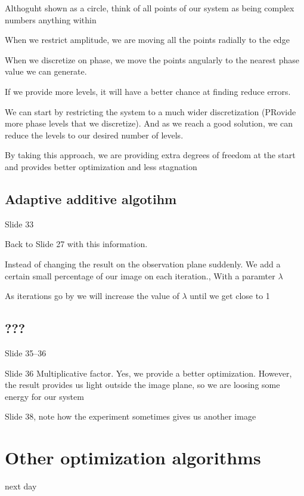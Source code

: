 \documentclass[../main/main.tex]{subfiles}
\begin{document}
Althoguht shown as a circle, think of all points of our system as being complex numbers anything within

When we restrict amplitude, we are moving all the points radially to the edge

When we discretize on phase, we move the points angularly to the nearest phase value we can generate.

If we provide more levels, it will have a better chance at finding reduce errors.

We can start by restricting the system to a much wider discretization (PRovide more phase levels that we discretize). And as we reach a good solution, we can reduce the levels to our desired number of levels.

By taking this approach, we are  providing extra degrees of freedom at the start and provides better optimization and less stagnation

\subsection{Adaptive additive algotihm}
Slide 33

Back to Slide 27 with this information.

Instead of changing the result on the observation plane suddenly. We add a certain small percentage of our image on each iteration., With a paramter $\lambda$

As iterations go by we will increase the value of $\lambda$ until we get close to 1


\subsection{???}

Slide 35--36


Slide 36
Multiplicative factor. Yes, we provide a better optimization. However, the result provides us light outside the image plane, so we are loosing some energy for our system



Slide 38, note how the experiment sometimes gives us another image

\section{Other optimization algorithms}

next day
\end{document}
